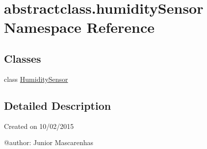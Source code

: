 \hypertarget{namespaceabstractclass_1_1humiditySensor}{}\section{abstractclass.\+humidity\+Sensor Namespace Reference}
\label{namespaceabstractclass_1_1humiditySensor}
\subsection*{Classes}
\begin{DoxyCompactItemize}
\item 
class \hyperlink{classabstractclass_1_1humiditySensor_1_1HumiditySensor}{Humidity\+Sensor}
\end{DoxyCompactItemize}


\subsection{Detailed Description}
\begin{DoxyVerb}Created on 10/02/2015

@author: Junior Mascarenhas
\end{DoxyVerb}
 